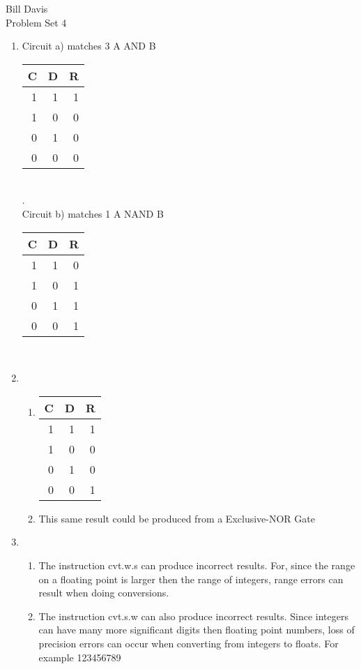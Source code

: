 \documentclass[11pt,fleqn]{article}
\begin{document}
\newcommand{\mbf}[1]{\mbox{{\bfseries #1}}}
\newcommand{\N}{\mbf{N}}
\renewcommand{\O}{\mbf{O}}

\noindent Bill Davis \\
 Problem Set 4

\begin{enumerate}
\item  
Circuit a) matches 3 A AND B \\
  \begin{tabular}{|r|r|r|}
  \hline
	C & D & R \\
  \hline
  1 & 1 & 1 \\
  1 & 0 & 0 \\
  0 & 1 & 0 \\
  0 & 0 & 0 \\
  \hline
  \end{tabular}
\\
.\\
Circuit b) matches 1 A NAND B \\
  \begin{tabular}{|r|r|r|}
  \hline
	C & D & R \\
  \hline
  1 & 1 & 0 \\
  1 & 0 & 1 \\
  0 & 1 & 1 \\
  0 & 0 & 1 \\
  \hline
  \end{tabular}
\\

\item 
  \begin{enumerate}
  \item  
  \begin{tabular}{|r|r|r|}
  \hline
	C & D & R \\
  \hline
  1 & 1 & 1 \\
  1 & 0 & 0 \\
  0 & 1 & 0 \\
  0 & 0 & 1 \\
  \hline
  \end{tabular}
  \item 
  This same result could be produced from a Exclusive-NOR Gate 
  \end{enumerate}

\item 
\begin{enumerate}
\item 
 The instruction cvt.w.s can produce incorrect results. For, since the range on a floating point is larger then the range of                                            integers, range errors can result when doing conversions. 
\item 
The instruction cvt.s.w can also produce incorrect results. Since integers can have many more significant digits then floating point numbers, loss of precision errors can occur when converting from integers to floats. For example 123456789


\end{enumerate}
\end{enumerate}
\end{document}
